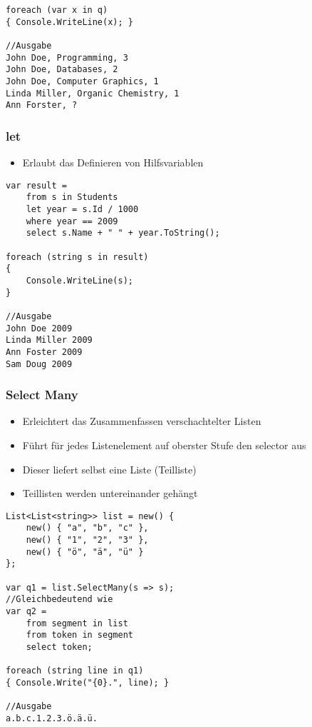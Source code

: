 \begin{multicols*}{2}
\begin{lstlisting}
foreach (var x in q)
{ Console.WriteLine(x); }

//Ausgabe 
John Doe, Programming, 3
John Doe, Databases, 2
John Doe, Computer Graphics, 1 
Linda Miller, Organic Chemistry, 1 
Ann Forster, ?
\end{lstlisting}
\subsubsection{let}
\begin{itemize}
    \item Erlaubt das Definieren von Hilfsvariablen
\end{itemize}
\begin{lstlisting}
var result =
    from s in Students
    let year = s.Id / 1000
    where year == 2009
    select s.Name + " " + year.ToString();

foreach (string s in result)
{
    Console.WriteLine(s);
}

//Ausgabe
John Doe 2009 
Linda Miller 2009 
Ann Foster 2009 
Sam Doug 2009
\end{lstlisting}
\subsubsection{Select Many}
\begin{itemize}
    \item Erleichtert das Zusammenfassen verschachtelter Listen
    \item Führt für jedes Listenelement auf oberster Stufe den selector aus
    \item Dieser liefert selbst eine Liste (Teilliste)
    \item Teillisten werden untereinander gehängt
\end{itemize}
\begin{lstlisting}
List<List<string>> list = new() {
    new() { "a", "b", "c" },
    new() { "1", "2", "3" },
    new() { "ö", "ä", "ü" }
};

var q1 = list.SelectMany(s => s);
//Gleichbedeutend wie
var q2 =
    from segment in list
    from token in segment
    select token;

foreach (string line in q1)
{ Console.Write("{0}.", line); }

//Ausgabe
a.b.c.1.2.3.ö.ä.ü.
\end{lstlisting}
\end{multicols*}
